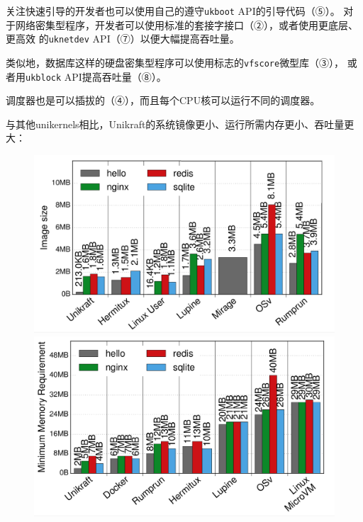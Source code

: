 \documentclass[UTF8,fontset=none,linespread=1.15]{ctexart}
\begin{document}
关注快速引导的开发者也可以使用自己的遵守\texttt{ukboot} API的引导代码（⑤）。
对于网络密集型程序，开发者可以使用标准的套接字接口（②），或者使用更底层、更高效
的\texttt{uknetdev} API（⑦）以便大幅提高吞吐量。

类似地，数据库这样的硬盘密集型程序可以使用标志的\texttt{vfscore}微型库（③），
或者用\texttt{ukblock} API提高吞吐量（⑧）。

调度器也是可以插拔的（④），而且每个CPU核可以运行不同的调度器。


与其他unikernels相比，Unikraft的系统镜像更小、运行所需内存更小、吞吐量更大：
\begin{figure}[H]
\centering
\begin{minipage}{0.32\linewidth}
\includegraphics[width=1\linewidth]{pictures/Unikraft-image-size.png}
\caption{}
\label{fig:unikraft-image-size}
\end{minipage}
\begin{minipage}{0.32\linewidth}
\includegraphics[width=1\linewidth]{pictures/Unikraft-memory.png}
\caption{}
\end{minipage}

\end{figure}
\end{document}
